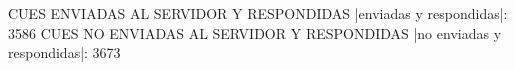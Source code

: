 CUES ENVIADAS AL SERVIDOR Y RESPONDIDAS
|enviadas y respondidas|: 3586
CUES NO ENVIADAS AL SERVIDOR Y RESPONDIDAS
|no enviadas y respondidas|: 3673